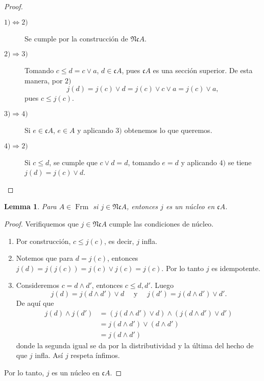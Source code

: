 \documentclass[11pt]{amsart}
\DeclareMathOperator{\Frm}{Frm}
\theoremstyle{plain}
\newtheorem{lem}[thm]{Lemma}
\theoremstyle{definition}
\begin{document}
\begin{proof}
    \begin{description}
        \item[$1)\Leftrightarrow 2)$] Se cumple por la construcción de $\mathfrak{Nc}A$.
        \item[$2)\Rightarrow 3)$] Tomando $c\leq d=c\vee a$, $d\in \mathfrak{c}A$, pues $\mathfrak{c}A$ es una sección superior. De esta manera, por $2)$
        \[
        j(d)=j(c)\vee d=j(c)\vee c\vee a=j(c)\vee a,
        \]
        pues $c\leq j(c)$.
        \item[$3)\Rightarrow 4)$] Si $e\in \mathfrak{c}A$, $e\in A$ y aplicando $3)$ obtenemos lo que queremos.
        \item[$4)\Rightarrow 2)$] Si $c\leq d$, se cumple que $c\vee d=d$, tomando $e=d$ y aplicando $4)$ se tiene $j(d)=j(c)\vee d$. 
    \end{description}
\end{proof}

\begin{lem}\label{Lema3.3}
    Para $A\in \Frm$ si $j\in \mathfrak{Nc}A$, entonces $j$ es un núcleo en $\mathfrak{c}A$.
\end{lem}

\begin{proof}
    Verifiquemos que $j\in \mathfrak{Nc}A$ cumple las condiciones de núcleo.
    \begin{enumerate}
        \item Por construcción, $c\leq j(c)$, es decir, $j$ infla.
        \item Notemos que para $d=j(c)$, entonces $j(d)=j(j(c))=j(c)\vee j(c)=j(c)$. Por lo tanto $j$ es idempotente.
        \item Consideremos $c=d\wedge d'$, entonces $c\leq d, d'$. Luego
        \[
        j(d)=j(d\wedge d')\vee d\quad \mbox{ y }\quad j(d')=j(d\wedge d')\vee d'.
        \]
        De aquí que 
        \[
        \begin{split}
            j(d)\wedge j(d')& =(j(d\wedge d')\vee d)\wedge (j(d\wedge d')\vee d')\\
            & =j(d\wedge d')\vee (d\wedge d')\\
            &=j(d\wedge d')
        \end{split}
        \]
        donde la segunda igual se da por la distributividad y la última del hecho de que $j$ infla. Así $j$ respeta ínfimos.
    \end{enumerate}
    Por lo tanto, $j$ es un núcleo en $\mathfrak{c}A$.
\end{proof}
\end{document}
